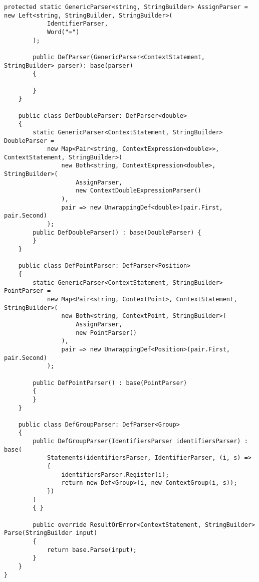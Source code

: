 \documentclass{scrartcl}
\begin{document}
\begin{lstlisting}[language={[Sharp]C}, caption={Def}, label={experiment}]
        protected static GenericParser<string, StringBuilder> AssignParser = new Left<string, StringBuilder, StringBuilder>(
            IdentifierParser,
            Word("=")
        );

        public DefParser(GenericParser<ContextStatement, StringBuilder> parser): base(parser)
        {

        }
    }

    public class DefDoubleParser: DefParser<double>
    {
        static GenericParser<ContextStatement, StringBuilder> DoubleParser =
            new Map<Pair<string, ContextExpression<double>>, ContextStatement, StringBuilder>(
                new Both<string, ContextExpression<double>, StringBuilder>(
                    AssignParser,
                    new ContextDoubleExpressionParser()
                ),
                pair => new UnwrappingDef<double>(pair.First, pair.Second)
            );
        public DefDoubleParser() : base(DoubleParser) {
        }
    }

    public class DefPointParser: DefParser<Position>
    {
        static GenericParser<ContextStatement, StringBuilder> PointParser =
            new Map<Pair<string, ContextPoint>, ContextStatement, StringBuilder>(
                new Both<string, ContextPoint, StringBuilder>(
                    AssignParser,
                    new PointParser()
                ),
                pair => new UnwrappingDef<Position>(pair.First, pair.Second)
            );

        public DefPointParser() : base(PointParser)
        {
        }
    }

    public class DefGroupParser: DefParser<Group>
    {
        public DefGroupParser(IdentifiersParser identifiersParser) : base(
            Statements(identifiersParser, IdentifierParser, (i, s) =>
            {
                identifiersParser.Register(i);
                return new Def<Group>(i, new ContextGroup(i, s));
            })
        )
        { }

        public override ResultOrError<ContextStatement, StringBuilder> Parse(StringBuilder input)
        {
            return base.Parse(input);
        }
    }
}

\end{lstlisting}
\end{document}
